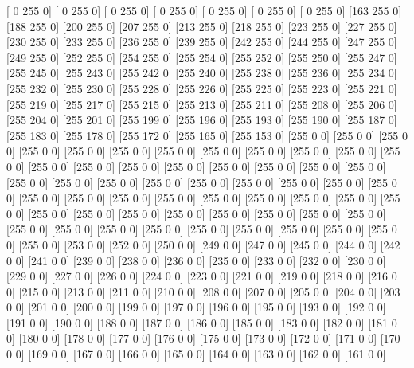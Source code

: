 [  0 255   0]
[  0 255   0]
[  0 255   0]
[  0 255   0]
[  0 255   0]
[  0 255   0]
[  0 255   0]
[163 255   0]
[188 255   0]
[200 255   0]
[207 255   0]
[213 255   0]
[218 255   0]
[223 255   0]
[227 255   0]
[230 255   0]
[233 255   0]
[236 255   0]
[239 255   0]
[242 255   0]
[244 255   0]
[247 255   0]
[249 255   0]
[252 255   0]
[254 255   0]
[255 254   0]
[255 252   0]
[255 250   0]
[255 247   0]
[255 245   0]
[255 243   0]
[255 242   0]
[255 240   0]
[255 238   0]
[255 236   0]
[255 234   0]
[255 232   0]
[255 230   0]
[255 228   0]
[255 226   0]
[255 225   0]
[255 223   0]
[255 221   0]
[255 219   0]
[255 217   0]
[255 215   0]
[255 213   0]
[255 211   0]
[255 208   0]
[255 206   0]
[255 204   0]
[255 201   0]
[255 199   0]
[255 196   0]
[255 193   0]
[255 190   0]
[255 187   0]
[255 183   0]
[255 178   0]
[255 172   0]
[255 165   0]
[255 153   0]
[255   0   0]
[255   0   0]
[255   0   0]
[255   0   0]
[255   0   0]
[255   0   0]
[255   0   0]
[255   0   0]
[255   0   0]
[255   0   0]
[255   0   0]
[255   0   0]
[255   0   0]
[255   0   0]
[255   0   0]
[255   0   0]
[255   0   0]
[255   0   0]
[255   0   0]
[255   0   0]
[255   0   0]
[255   0   0]
[255   0   0]
[255   0   0]
[255   0   0]
[255   0   0]
[255   0   0]
[255   0   0]
[255   0   0]
[255   0   0]
[255   0   0]
[255   0   0]
[255   0   0]
[255   0   0]
[255   0   0]
[255   0   0]
[255   0   0]
[255   0   0]
[255   0   0]
[255   0   0]
[255   0   0]
[255   0   0]
[255   0   0]
[255   0   0]
[255   0   0]
[255   0   0]
[255   0   0]
[255   0   0]
[255   0   0]
[255   0   0]
[255   0   0]
[255   0   0]
[255   0   0]
[255   0   0]
[255   0   0]
[255   0   0]
[253   0   0]
[252   0   0]
[250   0   0]
[249   0   0]
[247   0   0]
[245   0   0]
[244   0   0]
[242   0   0]
[241   0   0]
[239   0   0]
[238   0   0]
[236   0   0]
[235   0   0]
[233   0   0]
[232   0   0]
[230   0   0]
[229   0   0]
[227   0   0]
[226   0   0]
[224   0   0]
[223   0   0]
[221   0   0]
[219   0   0]
[218   0   0]
[216   0   0]
[215   0   0]
[213   0   0]
[211   0   0]
[210   0   0]
[208   0   0]
[207   0   0]
[205   0   0]
[204   0   0]
[203   0   0]
[201   0   0]
[200   0   0]
[199   0   0]
[197   0   0]
[196   0   0]
[195   0   0]
[193   0   0]
[192   0   0]
[191   0   0]
[190   0   0]
[188   0   0]
[187   0   0]
[186   0   0]
[185   0   0]
[183   0   0]
[182   0   0]
[181   0   0]
[180   0   0]
[178   0   0]
[177   0   0]
[176   0   0]
[175   0   0]
[173   0   0]
[172   0   0]
[171   0   0]
[170   0   0]
[169   0   0]
[167   0   0]
[166   0   0]
[165   0   0]
[164   0   0]
[163   0   0]
[162   0   0]
[161   0   0]
